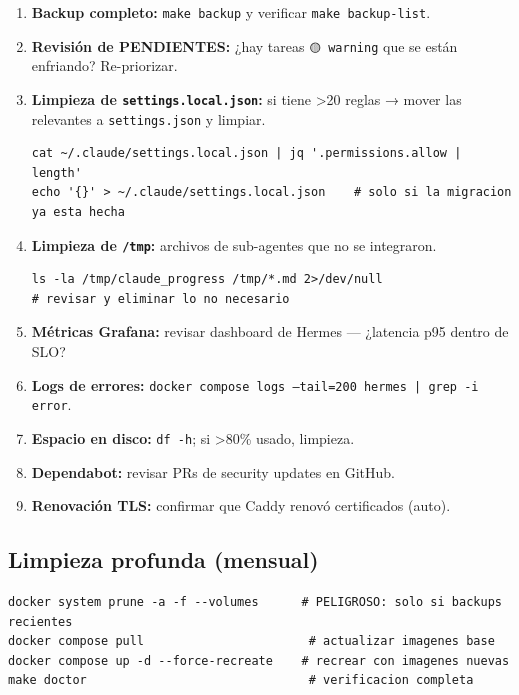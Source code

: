 \documentclass[11pt,a4paper]{article}
\begin{document}
\begin{enumerate}[leftmargin=*,itemsep=2pt]
\item \textbf{Backup completo:} \texttt{make backup} y verificar \texttt{make backup-list}.
\item \textbf{Revisión de PENDIENTES:} ¿hay tareas \texttt{🟡 warning} que se están enfriando? Re-priorizar.
\item \textbf{Limpieza de \texttt{settings.local.json}:} si tiene \textgreater 20 reglas → mover las relevantes a \texttt{settings.json} y limpiar.
\begin{lstlisting}[language=bashx]
cat ~/.claude/settings.local.json | jq '.permissions.allow | length'
echo '{}' > ~/.claude/settings.local.json    # solo si la migracion ya esta hecha
\end{lstlisting}
\item \textbf{Limpieza de \texttt{/tmp}:} archivos de sub-agentes que no se integraron.
\begin{lstlisting}[language=bashx]
ls -la /tmp/claude_progress /tmp/*.md 2>/dev/null
# revisar y eliminar lo no necesario
\end{lstlisting}
\item \textbf{Métricas Grafana:} revisar dashboard de Hermes — ¿latencia p95 dentro de SLO?
\item \textbf{Logs de errores:} \texttt{docker compose logs --tail=200 hermes | grep -i error}.
\item \textbf{Espacio en disco:} \texttt{df -h}; si \textgreater 80\% usado, limpieza.
\item \textbf{Dependabot:} revisar PRs de security updates en GitHub.
\item \textbf{Renovación TLS:} confirmar que Caddy renovó certificados (auto).
\end{enumerate}

\subsection{Limpieza profunda (mensual)}

\begin{lstlisting}[language=bashx]
docker system prune -a -f --volumes      # PELIGROSO: solo si backups recientes
docker compose pull                       # actualizar imagenes base
docker compose up -d --force-recreate    # recrear con imagenes nuevas
make doctor                               # verificacion completa
\end{lstlisting}
\end{document}
